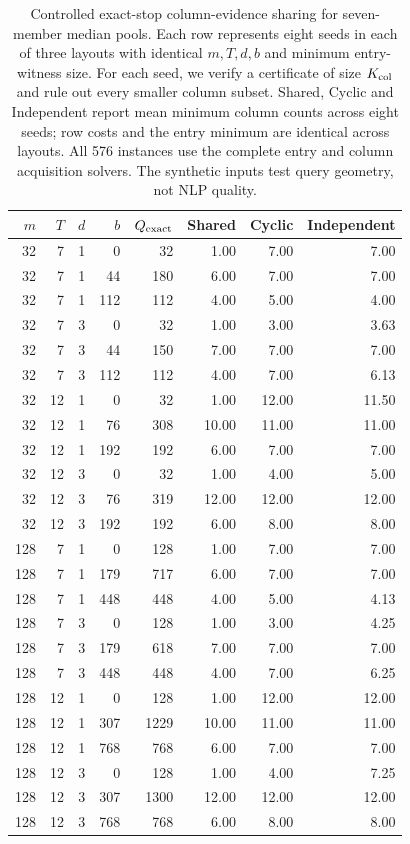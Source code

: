 \begin{table}[t]
\centering\small


\begin{tabular}{rrrrrrrr}
\toprule
$m$ & $T$ & $d$ & $b$ & $Q_{\rm exact}$ & Shared & Cyclic & Independent \\
\midrule
32 & 7 & 1 & 0 & 32 & 1.00 & 7.00 & 7.00 \\
32 & 7 & 1 & 44 & 180 & 6.00 & 7.00 & 7.00 \\
32 & 7 & 1 & 112 & 112 & 4.00 & 5.00 & 4.00 \\
32 & 7 & 3 & 0 & 32 & 1.00 & 3.00 & 3.63 \\
32 & 7 & 3 & 44 & 150 & 7.00 & 7.00 & 7.00 \\
32 & 7 & 3 & 112 & 112 & 4.00 & 7.00 & 6.13 \\
32 & 12 & 1 & 0 & 32 & 1.00 & 12.00 & 11.50 \\
32 & 12 & 1 & 76 & 308 & 10.00 & 11.00 & 11.00 \\
32 & 12 & 1 & 192 & 192 & 6.00 & 7.00 & 7.00 \\
32 & 12 & 3 & 0 & 32 & 1.00 & 4.00 & 5.00 \\
32 & 12 & 3 & 76 & 319 & 12.00 & 12.00 & 12.00 \\
32 & 12 & 3 & 192 & 192 & 6.00 & 8.00 & 8.00 \\
128 & 7 & 1 & 0 & 128 & 1.00 & 7.00 & 7.00 \\
128 & 7 & 1 & 179 & 717 & 6.00 & 7.00 & 7.00 \\
128 & 7 & 1 & 448 & 448 & 4.00 & 5.00 & 4.13 \\
128 & 7 & 3 & 0 & 128 & 1.00 & 3.00 & 4.25 \\
128 & 7 & 3 & 179 & 618 & 7.00 & 7.00 & 7.00 \\
128 & 7 & 3 & 448 & 448 & 4.00 & 7.00 & 6.25 \\
128 & 12 & 1 & 0 & 128 & 1.00 & 12.00 & 12.00 \\
128 & 12 & 1 & 307 & 1229 & 10.00 & 11.00 & 11.00 \\
128 & 12 & 1 & 768 & 768 & 6.00 & 7.00 & 7.00 \\
128 & 12 & 3 & 0 & 128 & 1.00 & 4.00 & 7.25 \\
128 & 12 & 3 & 307 & 1300 & 12.00 & 12.00 & 12.00 \\
128 & 12 & 3 & 768 & 768 & 6.00 & 8.00 & 8.00 \\
\bottomrule
\end{tabular}
\caption{Controlled exact-stop column-evidence sharing for seven-member median pools. Each row represents eight seeds in each of three layouts with identical $m,T,d,b$ and minimum entry-witness size. For each seed, we verify a certificate of size $K_{\rm col}$ and rule out every smaller column subset. Shared, Cyclic and Independent report mean minimum column counts across eight seeds; row costs and the entry minimum are identical across layouts. All 576 instances use the complete entry and column acquisition solvers. The synthetic inputs test query geometry, not NLP quality.}
\label{tab:synthetic-column-witnesses}
\end{table}
